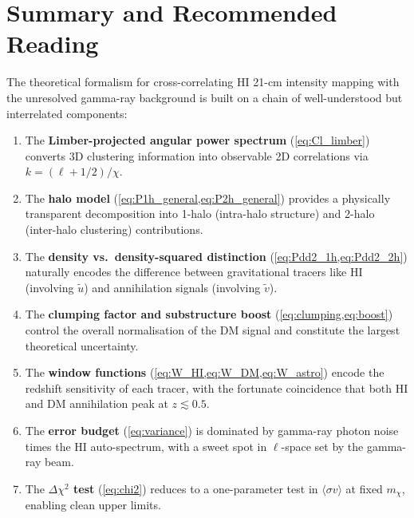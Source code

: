 \documentclass[10pt,a4paper]{article}
\newcommand{\utilde}{\tilde{u}}
\newcommand{\vtilde}{\tilde{v}}
\newcommand{\sigv}{\langle\sigma v\rangle}
\newcommand{\mchi}{m_\chi}
\begin{document}
\section{Summary and Recommended Reading}
\label{sec:summary}

The theoretical formalism for cross-correlating HI 21-cm intensity mapping with the unresolved gamma-ray background is built on a chain of well-understood but interrelated components:

\begin{enumerate}
    \item The \textbf{Limber-projected angular power spectrum} (\cref{eq:Cl_limber}) converts 3D clustering information into observable 2D correlations via $k = (\ell + 1/2)/\chi$.

    \item The \textbf{halo model} (\cref{eq:P1h_general,eq:P2h_general}) provides a physically transparent decomposition into 1-halo (intra-halo structure) and 2-halo (inter-halo clustering) contributions.

    \item The \textbf{density vs.\ density-squared distinction} (\cref{eq:Pdd2_1h,eq:Pdd2_2h}) naturally encodes the difference between gravitational tracers like HI (involving $\utilde$) and annihilation signals (involving $\vtilde$).

    \item The \textbf{clumping factor and substructure boost} (\cref{eq:clumping,eq:boost}) control the overall normalisation of the DM signal and constitute the largest theoretical uncertainty.

    \item The \textbf{window functions} (\cref{eq:W_HI,eq:W_DM,eq:W_astro}) encode the redshift sensitivity of each tracer, with the fortunate coincidence that both HI and DM annihilation peak at $z \lesssim 0.5$.

    \item The \textbf{error budget} (\cref{eq:variance}) is dominated by gamma-ray photon noise times the HI auto-spectrum, with a sweet spot in $\ell$-space set by the gamma-ray beam.

    \item The \textbf{$\Delta\chi^2$ test} (\cref{eq:chi2}) reduces to a one-parameter test in $\sigv$ at fixed $\mchi$, enabling clean upper limits.
\end{enumerate}
\end{document}
